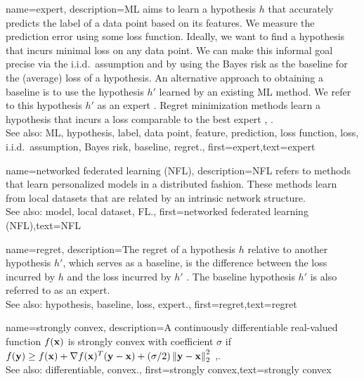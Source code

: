 {name={expert},
	description={ML aims to learn a hypothesis $h$ that accurately predicts the label 
		of a data point based on its features. We measure the prediction error using 
		some loss function. Ideally, we want to find a hypothesis that incurs minimal loss 
		on any data point. We can make this informal goal precise via the i.i.d.\ assumption 
		and by using the Bayes risk as the baseline for the (average) loss of a hypothesis. 
		An alternative approach to obtaining a baseline is to use the hypothesis $h'$ learned 
		by an existing ML method. We refer to this hypothesis $h'$ as an expert \cite{PredictionLearningGames}. Regret minimization methods learn a hypothesis
		that incurs a loss comparable to the best expert \cite{PredictionLearningGames}, \cite{HazanOCO}.
					\\ 
		See also: ML, hypothesis, label, data point, feature, prediction, loss function, loss, i.i.d.\ assumption, Bayes risk, baseline, regret.},
	first={expert},text={expert} 
}

{name={networked federated learning (NFL)},
	description={NFL refers 
		to methods that learn personalized models in a distributed fashion. These methods learn from local datasets 
		that are related by an intrinsic network structure.
					\\ 
		See also: model, local dataset, FL.},
 first={networked federated learning (NFL)},text={NFL} 
}




{name={regret},
	description={The regret of a hypothesis $h$ relative to 
		another hypothesis $h'$, which serves as a baseline, 
		is the difference between the loss incurred by $h$ and the loss 
		incurred by $h'$ \cite{PredictionLearningGames}. 
		The baseline hypothesis $h'$ is also referred to as an expert.
					\\ 
		See also: hypothesis, baseline, loss, expert.},
	first={regret},text={regret} 
}

{name={strongly convex},
	description={A continuously differentiable real-valued 
		function $f({\bf x})$ is strongly convex with coefficient $\sigma$ if $f({\bf y}) \geq f({\bf x}) + \nabla f({\bf x})^{T} ({\bf y} - {\bf x}) + (\sigma/2) \left\Vert  {{\bf y} - {\bf x}} \right\Vert_{2}^{2}$ \cite{nesterov04},\cite[Sec. B.1.1]{CvxAlgBertsekas}.
					\\ 
		See also: differentiable, convex.},
	first={strongly convex},text={strongly convex} 
}

